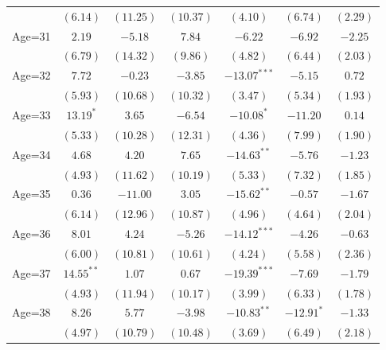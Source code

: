 \documentclass[fullpage]{paper}
\begin{document}
\begin{center}
\begin{longtable}{l c c c c c c }
            & $(6.14)$      & $(11.25)$     & $(10.37)$     & $(4.10)$       & $(6.74)$       & $(2.29)$      \\
Age=31      & $2.19$        & $-5.18$       & $7.84$        & $-6.22$        & $-6.92$        & $-2.25$       \\
            & $(6.79)$      & $(14.32)$     & $(9.86)$      & $(4.82)$       & $(6.44)$       & $(2.03)$      \\
Age=32      & $7.72$        & $-0.23$       & $-3.85$       & $-13.07^{***}$ & $-5.15$        & $0.72$        \\
            & $(5.93)$      & $(10.68)$     & $(10.32)$     & $(3.47)$       & $(5.34)$       & $(1.93)$      \\
Age=33      & $13.19^{*}$   & $3.65$        & $-6.54$       & $-10.08^{*}$   & $-11.20$       & $0.14$        \\
            & $(5.33)$      & $(10.28)$     & $(12.31)$     & $(4.36)$       & $(7.99)$       & $(1.90)$      \\
Age=34      & $4.68$        & $4.20$        & $7.65$        & $-14.63^{**}$  & $-5.76$        & $-1.23$       \\
            & $(4.93)$      & $(11.62)$     & $(10.19)$     & $(5.33)$       & $(7.32)$       & $(1.85)$      \\
Age=35      & $0.36$        & $-11.00$      & $3.05$        & $-15.62^{**}$  & $-0.57$        & $-1.67$       \\
            & $(6.14)$      & $(12.96)$     & $(10.87)$     & $(4.96)$       & $(4.64)$       & $(2.04)$      \\
Age=36      & $8.01$        & $4.24$        & $-5.26$       & $-14.12^{***}$ & $-4.26$        & $-0.63$       \\
            & $(6.00)$      & $(10.81)$     & $(10.61)$     & $(4.24)$       & $(5.58)$       & $(2.36)$      \\
Age=37      & $14.55^{**}$  & $1.07$        & $0.67$        & $-19.39^{***}$ & $-7.69$        & $-1.79$       \\
            & $(4.93)$      & $(11.94)$     & $(10.17)$     & $(3.99)$       & $(6.33)$       & $(1.78)$      \\
Age=38      & $8.26$        & $5.77$        & $-3.98$       & $-10.83^{**}$  & $-12.91^{*}$   & $-1.33$       \\
            & $(4.97)$      & $(10.79)$     & $(10.48)$     & $(3.69)$       & $(6.49)$       & $(2.18)$      \\

\end{longtable}
\end{center}
\end{document}

